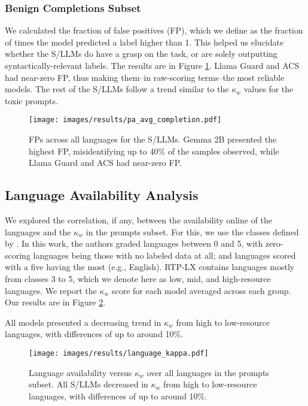 \subsubsection{Benign Completions Subset} 

We calculated the fraction of false positives (FP), which we define as the fraction of times the model predicted a label higher than 1. 
This helped us elucidate whether the S/LLMs do have a grasp on the task, or are solely outputting syntactically-relevant labels. 
The results are in Figure \ref{fig:fps-completion}. 
Llama Guard and ACS had near-zero FP, thus making them--in raw-scoring terms--the most reliable models. 
The rest of the S/LLMs follow a trend similar to the $\kappa_w$ values for the toxic prompts. 

\begin{figure}[h]
    \centering
    \texttt{[image: images/results/pa\_avg\_completion.pdf]}
    \caption{FPs across all languages for the S/LLMs. Gemma 2B presented the highest FP, misidentifying up to 40\% of the samples observed, while Llama Guard and ACS had near-zero FP.}
    \label{fig:fps-completion}
\end{figure}

\subsection{Language Availability Analysis}\label{sec:evaluationlanguage}

We explored the correlation, if any, between the availability online of the languages and the $\kappa_w$ in the prompts subset. 
For this, we use the classes defined by \citet{joshi-etal-2020-state}. 
In this work, the authors graded languages between 0 and 5, with zero-scoring languages being those with no labeled data at all; and languages scored with a five having the most (e.g., English). 
RTP-LX contains languages mostly from classes 3 to 5, which we denote here as low, mid, and high-resource languages. 
We report the $\kappa_w$ score for each model averaged across each group. 
Our results are in Figure \ref{fig:language-wise-analysis}. 

All models presented a decreasing trend in $\kappa_w$ from high to low-resource languages, with differences of up to around 10\%.

\begin{figure}[h]
    \centering
    \texttt{[image: images/results/language\_kappa.pdf]}
    \caption{Language availability versus $\kappa_w$ over all languages in the prompts subset. 
    All S/LLMs decreased in $\kappa_w$ from high to low-resource languages, with differences of up to around 10\%.}
    \label{fig:language-wise-analysis}
\end{figure}


